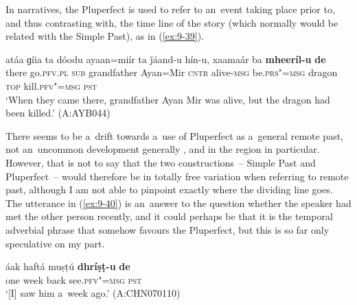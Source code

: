 In narratives, the Pluperfect is used to refer to an~event taking place prior to, and thus contrasting with, the time line of the story (which normally would be related with the Simple Past), as in (\ref{ex:9-39}).

\begin{exe}
\ex
\label{ex:9-39}
\gll atáa ɡíia ta dóodu ayaan=miír ta ǰáand-u hín-u, xaamaár ba \textbf{mheeríl-u} \textbf{de} \\
there go.\textsc{pfv.pl} \textsc{sub} grandfather Ayan=Mir \textsc{cntr}  alive-\textsc{msg}
be.\textsc{prs"=msg} dragon \textsc{top} kill.\textsc{pfv"=msg} \textsc{pst} \\
\glt `When they came there, grandfather Ayan Mir was alive, but the dragon had been killed.' (A:AYB044) 
\end{exe}

There seems to be a~drift towards a~use of Pluperfect as a~general remote past, not an~uncommon development generally \citep[147]{dahl1985}, and in the region in particular. However, that is not to say that the two constructions~-- Simple Past and Pluperfect~-- would therefore be in totally free variation when referring to remote past, although I am not able to pinpoint exactly where the dividing line goes. The utterance in (\ref{ex:9-40}) is an~answer to the question whether the speaker had met the other person recently, and it could perhaps be that it is the temporal adverbial phrase that somehow favours the Pluperfect, but this is so far only speculative on my part.

\begin{exe}
\ex
\label{ex:9-40}
\gll áak haftá muṣṭú \textbf{dhríṣṭ-u} \textbf{de}  \\
one week back see.\textsc{pfv"=msg} \textsc{pst} \\
\glt `[I] saw him a~week ago.' (A:CHN070110)
\end{exe}

